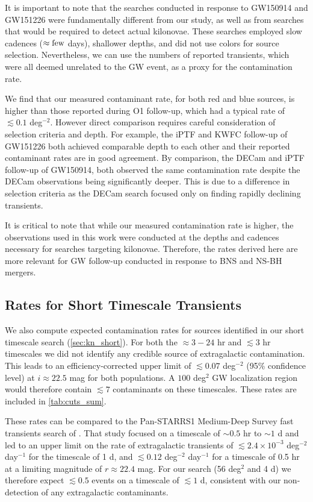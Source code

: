 It is important to note that the searches conducted in response to GW150914 and GW151226 were fundamentally different from our study, as well as from searches that would be required to detect actual kilonovae. These searches employed slow cadences ($\approx \rm few$ days), shallower depths, and did not use colors for source selection. Nevertheless, we can use the numbers of reported transients, which were all deemed unrelated to the GW event, as a proxy for the contamination rate.

We find that our measured contaminant rate, for both red and blue sources, is higher than those reported during O1 follow-up, which had a typical rate of  $\lesssim 0.1$ deg$^{-2}$. However direct comparison requires careful consideration of selection criteria and depth. For example, the iPTF and KWFC follow-up of GW151226 both achieved comparable depth to each other and their reported contaminant rates are in good agreement. By comparison, the DECam and iPTF follow-up of GW150914, both observed the same contamination rate despite the DECam observations being significantly deeper. This is due to a difference in selection criteria as the DECam search focused only on finding rapidly declining transients.

It is critical to note that while our measured contamination rate is higher, the observations used in this work were conducted at the depths and cadences necessary for searches targeting kilonovae. Therefore, the rates derived here are more relevant for GW follow-up conducted in response to BNS and NS-BH mergers. 

\subsection{Rates for Short Timescale Transients}
\label{sec:rates_short}

We also compute expected contamination rates for sources identified in our short timescale search (\autoref{sec:kn_short}). For both the $\approx 3-24$ hr and $\lesssim 3$ hr timescales we did not identify any credible source of extragalactic contamination. This leads to an efficiency-corrected upper limit of $\lesssim 0.07$ deg$^{-2}$ (95\% confidence level) at $i\approx 22.5$ mag for both populations. A $100$ deg$^2$ GW localization region would therefore contain $\lesssim 7$ contaminants on these timescales. These rates are included in \autoref{tab:cuts_sum}.

These rates can be compared to the Pan-STARRS1 Medium-Deep Survey fast transients search of \cite{berger+13}. That study focused on a timescale of $\sim 0.5$ hr to $\sim 1$ d and led to an upper limit on the rate of extragalactic transients of $\lesssim 2.4\times 10^{-3}$ deg$^{-2}$ day$^{-1}$ for the timescale of 1 d, and $\lesssim 0.12$ deg$^{-2}$ day$^{-1}$ for a timescale of 0.5 hr at a limiting magnitude of $r\approx 22.4$ mag. For our search (56 deg$^2$ and 4 d) we therefore expect $\lesssim 0.5$ events on a timescale of $\lesssim 1$ d, consistent with our non-detection of any extragalactic contaminants.

